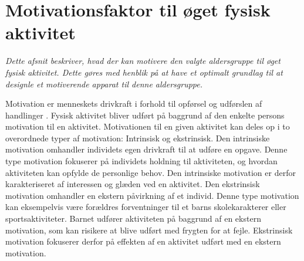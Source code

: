 \section{Motivationsfaktor til øget fysisk aktivitet}\label{motivation_boern}
\textit{Dette afsnit beskriver, hvad der kan motivere den valgte aldersgruppe til øget fysisk aktivitet. Dette gøres med henblik på at have et optimalt grundlag til at designle et motiverende apparat til denne aldersgruppe.}

Motivation er menneskets drivkraft i forhold til opførsel og udførslen af handlinger \citep{V.Brown2007}. Fysisk aktivitet bliver udført på baggrund af den enkelte persons motivation til en aktivitet. Motivationen til en given aktivitet kan deles op i to overordnede typer af motivation: Intrinsisk og ekstrinsisk. Den intrinsiske motivation omhandler individets egen drivkraft til at udføre en opgave. Denne type motivation fokuserer på individets holdning til aktiviteten, og hvordan aktiviteten kan opfylde de personlige behov. Den intrinsiske motivation er derfor karakteriseret af interessen og glæden ved en aktivitet. Den ekstrinsisk motivation omhandler en ekstern påvirkning af et individ. Denne type motivation kan eksempelvis være forældres forventninger til et barns skolekarakterer eller sportsaktiviteter. Barnet udfører aktiviteten på baggrund af en ekstern motivation, som kan risikere at blive udført med frygten for at fejle. Ekstrinsisk motivation fokuserer derfor på effekten af en aktivitet udført med en ekstern motivation. \citep{J.Sebire2013} 

